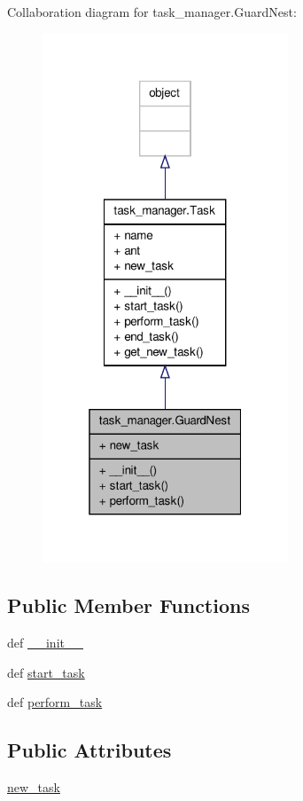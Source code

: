 Collaboration diagram for task\+\_\+manager.\+Guard\+Nest\+:
\nopagebreak
\begin{figure}[H]
\begin{center}
\leavevmode
\includegraphics[width=208pt]{classtask__manager_1_1GuardNest__coll__graph}
\end{center}
\end{figure}
\subsection*{Public Member Functions}
\begin{DoxyCompactItemize}
\item 
def \hyperlink{classtask__manager_1_1GuardNest_ac1b98762825c860890caff5649269cb1}{\+\_\+\+\_\+init\+\_\+\+\_\+}
\item 
def \hyperlink{classtask__manager_1_1GuardNest_a44493cf7d0653d2b548040a5857ef330}{start\+\_\+task}
\item 
def \hyperlink{classtask__manager_1_1GuardNest_a18003edc3f1e2fca7bfe34cf078e96f8}{perform\+\_\+task}
\end{DoxyCompactItemize}
\subsection*{Public Attributes}
\begin{DoxyCompactItemize}
\item 
\hyperlink{classtask__manager_1_1GuardNest_ada22ecced047079d5f4d98a0b86a2d0e}{new\+\_\+task}
\end{DoxyCompactItemize}


